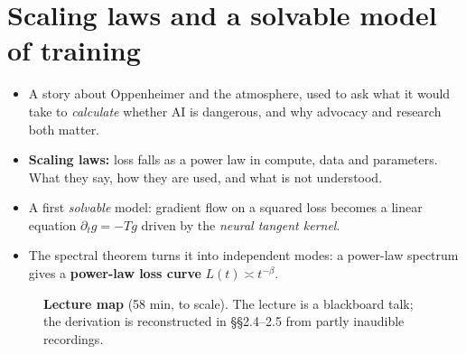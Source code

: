 \chapter{Scaling laws and a solvable model of training}\label{ch:L2}

\begin{glance}
\begin{itemize}
  \item A story about Oppenheimer and the atmosphere, used to ask what it would take to \emph{calculate} whether AI is dangerous, and why advocacy and research both matter.
  \item \textbf{Scaling laws:} loss falls as a power law in compute, data and parameters. What they say, how they are used, and what is not understood.
  \item A first \emph{solvable} model: gradient flow on a squared loss becomes a linear equation $\partial_t g=-Tg$ driven by the \emph{neural tangent kernel}.
  \item The spectral theorem turns it into independent modes: a power-law spectrum gives a \textbf{power-law loss curve} $L(t)\asymp t^{-\beta}$.
\end{itemize}
\end{glance}

\begin{figure}[tb]
\centering
{}
\caption{\textbf{Lecture map} (58 min, to scale). The lecture is a blackboard talk; the derivation is reconstructed in \S\S2.4--2.5 from partly inaudible recordings.}
\end{figure}

